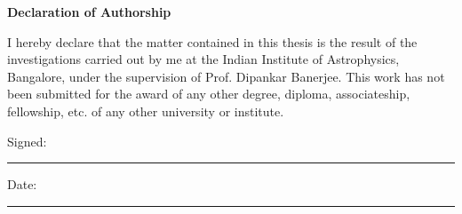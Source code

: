 \noindent
\vspace{2.5cm}
\begin{center}{\huge\bf Declaration of Authorship}\end{center}
\thispagestyle{empty}
I hereby declare that the matter contained in this thesis is the result of the investigations carried out by me at the Indian Institute of Astrophysics, Bangalore, under the supervision of Prof. Dipankar Banerjee. This work has not been submitted for the award of any other degree, diploma, associateship, fellowship, etc. of any other university or institute.

Signed:\\
\rule[1em]{25em}{1.0pt}  %
 
Date:\\
\rule[1em]{25em}{1.0pt}  %

\clearpage  %
\thispagestyle{empty}
